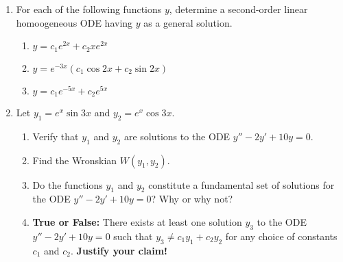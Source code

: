 \documentclass[12pt]{article}
\theoremstyle{definition}
\theoremstyle{underl}
\begin{document}
\begin{enumerate}[topsep=0.125in,itemsep=3mm]
		\item For each of the following functions $y$, determine a second-order linear homoogeneous ODE having $y$ as a general solution. 
		\begin{enumerate}
			\item $y=c_1e^{2x}+c_2xe^{2x}$
			\item $y=e^{-3x}\left(c_1\cos{2x}+c_2\sin{2x}\right)$
			\item $y=c_1e^{-5x}+c_2e^{5x}$
		\end{enumerate}
		
		\newpage
		
		\item Let $y_1=e^x\sin{3x}$ and $y_2=e^x\cos{3x}$.
		\begin{enumerate}
			\item Verify that $y_1$ and $y_2$ are solutions to the ODE $y''-2y'+10y=0$.
			\item Find the Wronskian $W(y_1,y_2)$.
			\item Do the functions $y_1$ and $y_2$ constitute a fundamental set of solutions for the ODE $y''-2y'+10y=0$? Why or why not?
			\item \textbf{True or False:} There exists at least one solution $y_3$ to the ODE $y''-2y'+10y=0$ such that $y_3\neq c_1y_1+c_2y_2$ for any choice of constants $c_1$ and $c_2$. \textbf{Justify your claim!}
		\end{enumerate}
	\end{enumerate}
\end{document}

